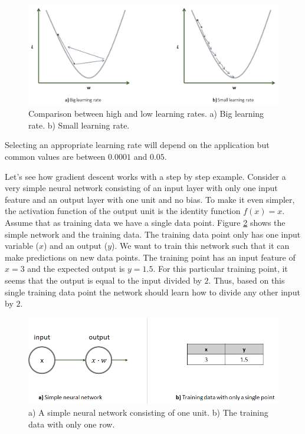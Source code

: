 \documentclass[
  11pt,
]{krantz}
\begin{document}
\begin{figure}

{\centering \includegraphics[width=1\linewidth]{images/nn_lr} 

}

\caption{Comparison between high and low learning rates. a) Big learning rate. b) Small learning rate.}\label{fig:nnLR}
\end{figure}

Selecting an appropriate learning rate will depend on the application but common values are between \(0.0001\) and \(0.05\).

Let's see how gradient descent works with a step by step example. Consider a very simple neural network consisting of an input layer with only one input feature and an output layer with one unit and no bias. To make it even simpler, the activation function of the output unit is the identity function \(f(x)=x\). Assume that as training data we have a single data point. Figure \ref{fig:nnStepExample} shows the simple network and the training data. The training data point only has one input variable (\(x\)) and an output (\(y\)). We want to train this network such that it can make predictions on new data points. The training point has an input feature of \(x=3\) and the expected output is \(y=1.5\). For this particular training point, it seems that the output is equal to the input divided by \(2\). Thus, based on this single training data point the network should learn how to divide any other input by \(2\).

\begin{figure}

{\centering \includegraphics[width=1\linewidth]{images/nn_step_example} 

}

\caption{a) A simple neural network consisting of one unit. b) The training data with only one row.}\label{fig:nnStepExample}
\end{figure}
\end{document}
